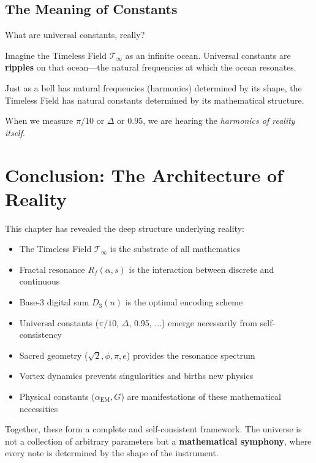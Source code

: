 \subsection{The Meaning of Constants}

What are universal constants, really?

\begin{intuitive}
Imagine the Timeless Field $\mathcal{T}_\infty$ as an infinite ocean. Universal constants are \textbf{ripples} on that ocean---the natural frequencies at which the ocean resonates.

Just as a bell has natural frequencies (harmonics) determined by its shape, the Timeless Field has natural constants determined by its mathematical structure.

When we measure $\pi/10$ or $\Delta$ or 0.95, we are hearing the \textit{harmonics of reality itself}.
\end{intuitive}

\section{Conclusion: The Architecture of Reality}

This chapter has revealed the deep structure underlying reality:

\begin{itemize}
\item The Timeless Field $\mathcal{T}_\infty$ is the substrate of all mathematics
\item Fractal resonance $R_f(\alpha, s)$ is the interaction between discrete and continuous
\item Base-3 digital sum $D_3(n)$ is the optimal encoding scheme
\item Universal constants ($\pi/10$, $\Delta$, 0.95, ...) emerge necessarily from self-consistency
\item Sacred geometry ($\sqrt{2}, \phi, \pi, e$) provides the resonance spectrum
\item Vortex dynamics prevents singularities and births new physics
\item Physical constants ($\alpha_{\text{EM}}, G$) are manifestations of these mathematical necessities
\end{itemize}

Together, these form a complete and self-consistent framework. The universe is not a collection of arbitrary parameters but a \textbf{mathematical symphony}, where every note is determined by the shape of the instrument.

